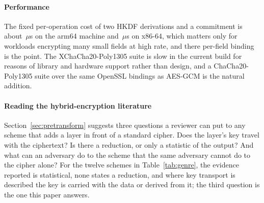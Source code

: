 \paragraph{Performance}
The fixed per-operation cost of two HKDF derivations and a commitment is about \CpdpmFixedUs\,$\mu$s on the arm64 machine and \XCpdpmFixedUs\,$\mu$s on x86-64, which matters only for workloads encrypting many small fields at high rate, and there per-field binding is the point. The XChaCha20-Poly1305 suite is slow in the current build for reasons of library and hardware support rather than design, and a ChaCha20-Poly1305 suite over the same OpenSSL bindings as AES-GCM is the natural addition.

\paragraph{Reading the hybrid-encryption literature}
Section~\ref{sec:pretransform} suggests three questions a reviewer can put to any scheme that adds a layer in front of a standard cipher. Does the layer's key travel with the ciphertext? Is there a reduction, or only a statistic of the output? And what can an adversary do to the scheme that the same adversary cannot do to the cipher alone? For the twelve schemes in Table~\ref{tab:genre}, the evidence reported is statistical, none states a reduction, and where key transport is described the key is carried with the data or derived from it; the third question is the one this paper answers.
